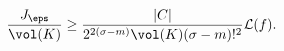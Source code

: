 \begin{align}
\frac{J_\eps}{\vol(K)}	%
					&\geq\frac{|C|}{2^{2(\sigma-m)}\vol(K)(\sigma-m)!^2}\mathcal{L}(f).\nonumber
\end{align}
